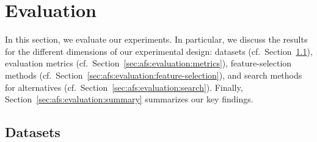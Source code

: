 \documentclass{article}
\theoremstyle{definition}
\begin{document}
\section{Evaluation}
\label{sec:afs:evaluation}

In this section, we evaluate our experiments.
In particular, we discuss the results for the different dimensions of our experimental design:
datasets (cf.~Section~\ref{sec:afs:evaluation:datasets}), evaluation metrics (cf.~Section~\ref{sec:afs:evaluation:metrics}), feature-selection methods (cf.~Section~\ref{sec:afs:evaluation:feature-selection}), and search methods for alternatives (cf.~Section~\ref{sec:afs:evaluation:search}).
Finally, Section~\ref{sec:afs:evaluation:summary} summarizes our key findings.

\subsection{Datasets}
\label{sec:afs:evaluation:datasets}
\end{document}
